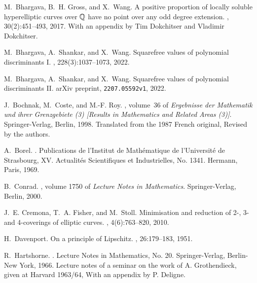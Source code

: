 \documentclass{article} %
\numberwithin{equation}{section}
\begin{document}
\begin{thebibliography}{10}
M.~Bhargava, B.~H. Gross, and X.~Wang.
\newblock A positive proportion of locally soluble hyperelliptic curves over
  {$\Bbb Q$} have no point over any odd degree extension.
, 30(2):451--493, 2017.
\newblock With an appendix by Tim Dokchitser and Vladimir Dokchitser.

M.~Bhargava, A.~Shankar, and X.~Wang.
\newblock Squarefree values of polynomial discriminants {I}.
, 228(3):1037--1073, 2022.

M.~Bhargava, A.~Shankar, and X.~Wang.
\newblock Squarefree values of polynomial discriminants {II}.
\newblock arXiv preprint, \texttt{2207.05592v1}, 2022.

J.~Bochnak, M.~Coste, and M.-F. Roy.
, volume~36 of {\em Ergebnisse der
  Mathematik und ihrer Grenzgebiete (3) [Results in Mathematics and Related
  Areas (3)]}.
\newblock Springer-Verlag, Berlin, 1998.
\newblock Translated from the 1987 French original, Revised by the authors.

A.~Borel.
.
\newblock Publications de l'Institut de Math\'{e}matique de l'Universit\'{e} de
  Strasbourg, XV. Actualit\'{e}s Scientifiques et Industrielles, No. 1341.
  Hermann, Paris, 1969.

B.~Conrad.
, volume 1750 of {\em
  Lecture Notes in Mathematics}.
\newblock Springer-Verlag, Berlin, 2000.

J.~E. Cremona, T.~A. Fisher, and M.~Stoll.
\newblock Minimisation and reduction of 2-, 3- and 4-coverings of elliptic
  curves.
, 4(6):763--820, 2010.

H.~Davenport.
\newblock On a principle of {L}ipschitz.
, 26:179--183, 1951.

R.~Hartshorne.
.
\newblock Lecture Notes in Mathematics, No. 20. Springer-Verlag, Berlin-New
  York, 1966.
\newblock Lecture notes of a seminar on the work of A. Grothendieck, given at
  Harvard 1963/64, With an appendix by P. Deligne.


\end{thebibliography}
\end{document}
